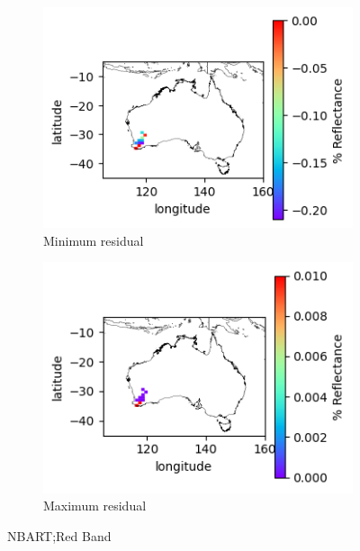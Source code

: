 \documentclass[a4paper]{article}
\begin{document}
      \begin{figure}[h!]
        \centering
          \begin{subfigure}[l]{.4\linewidth}
            \hspace{-32mm}
            \includegraphics[scale=0.9]{plots/nbart/nbart_red-MinResidual.png}
            \caption{Minimum residual}
          \end{subfigure}
%
          \begin{subfigure}[r]{.4\linewidth}
            \includegraphics[scale=0.9]{plots/nbart/nbart_red-MaxResidual.png}
            \caption{Maximum residual}
          \end{subfigure}
        \caption{NBART;\@ Red Band}\label{figure:7}
      \end{figure}
\end{document}

